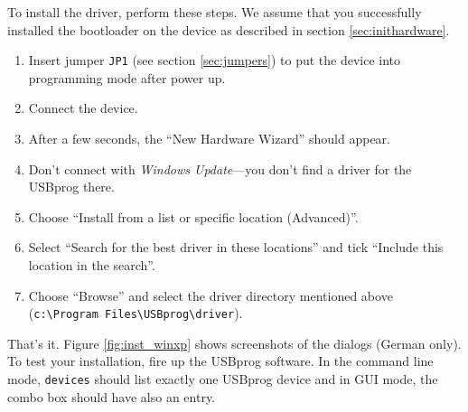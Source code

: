 \documentclass[bibtotoc,UKenglish,halfparskip,oneside,DIV12]{scrreprt}
\begin{document}
To install the driver, perform these steps. We assume that you successfully installed the bootloader
on the device as described in section \vref{sec:inithardware}.

\begin{enumerate}
  \item Insert jumper \texttt{JP1} (see section \vref{sec:jumpers}) to put the device into
    programming mode after power up.
  \item Connect the device.
  \item After a few seconds, the ``New Hardware Wizard'' should appear.
  \item Don't connect with \emph{Windows Update}---you don't find a driver for the USBprog there.
  \item Choose ``Install from a list or specific location (Advanced)''.
  \item Select ``Search for the best driver in these locations'' and tick ``Include this location in
    the search''.
  \item Choose ``Browse'' and select the driver directory mentioned above \newline
    (\texttt{c:\textbackslash{}Program Files\textbackslash{}USBprog\textbackslash{}driver}).
\end{enumerate}

That's it. Figure \vref{fig:inst_winxp} shows screenshots of the dialogs (German only). To test your
installation, fire up the USBprog software. In the command line mode, \texttt{devices} should list
exactly one USBprog device and in GUI mode, the combo box should have also an entry.
\end{document}
